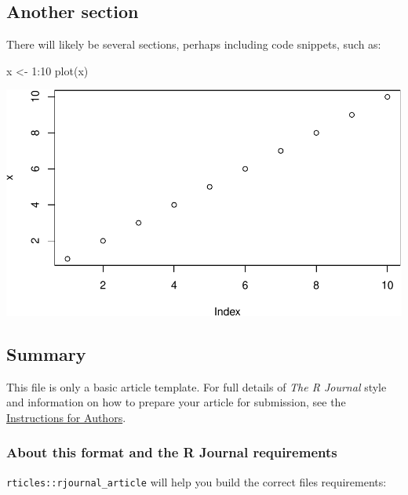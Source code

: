 \hypertarget{another-section}{%
\subsection{Another section}\label{another-section}}

There will likely be several sections, perhaps including code snippets,
such as:

\begin{Schunk}
\begin{Sinput}
x <- 1:10
plot(x)
\end{Sinput}

\includegraphics{overview-single-source_files/figure-latex/unnamed-chunk-1-1} \end{Schunk}

\hypertarget{summary}{%
\subsection{Summary}\label{summary}}

This file is only a basic article template. For full details of
\emph{The R Journal} style and information on how to prepare your
article for submission, see the
\href{https://journal.r-project.org/share/author-guide.pdf}{Instructions
for Authors}.

\hypertarget{about-this-format-and-the-r-journal-requirements}{%
\subsubsection{About this format and the R Journal
requirements}\label{about-this-format-and-the-r-journal-requirements}}

\texttt{rticles::rjournal\_article} will help you build the correct
files requirements:

